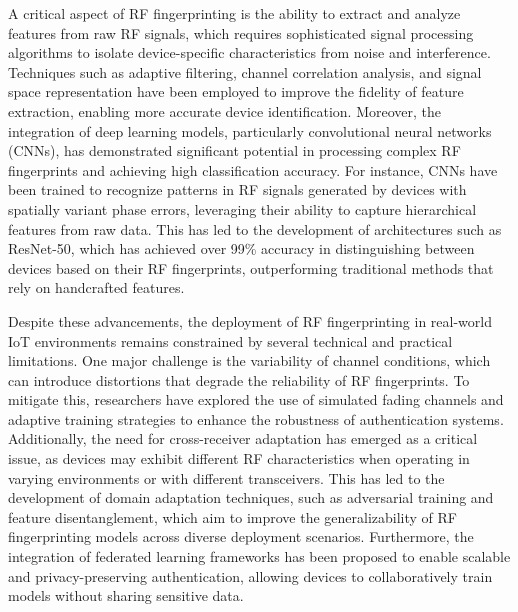 \documentclass[conference]{IEEEtran}
\begin{document}
A critical aspect of RF fingerprinting is the ability to extract and analyze features from raw RF signals, which requires sophisticated signal processing algorithms to isolate device-specific characteristics from noise and interference. Techniques such as adaptive filtering, channel correlation analysis, and signal space representation have been employed to improve the fidelity of feature extraction, enabling more accurate device identification. Moreover, the integration of deep learning models, particularly convolutional neural networks (CNNs), has demonstrated significant potential in processing complex RF fingerprints and achieving high classification accuracy. For instance, CNNs have been trained to recognize patterns in RF signals generated by devices with spatially variant phase errors, leveraging their ability to capture hierarchical features from raw data. This has led to the development of architectures such as ResNet-50, which has achieved over 99\% accuracy in distinguishing between devices based on their RF fingerprints, outperforming traditional methods that rely on handcrafted features.  

Despite these advancements, the deployment of RF fingerprinting in real-world IoT environments remains constrained by several technical and practical limitations. One major challenge is the variability of channel conditions, which can introduce distortions that degrade the reliability of RF fingerprints. To mitigate this, researchers have explored the use of simulated fading channels and adaptive training strategies to enhance the robustness of authentication systems. Additionally, the need for cross-receiver adaptation has emerged as a critical issue, as devices may exhibit different RF characteristics when operating in varying environments or with different transceivers. This has led to the development of domain adaptation techniques, such as adversarial training and feature disentanglement, which aim to improve the generalizability of RF fingerprinting models across diverse deployment scenarios. Furthermore, the integration of federated learning frameworks has been proposed to enable scalable and privacy-preserving authentication, allowing devices to collaboratively train models without sharing sensitive data.  
\end{document}
